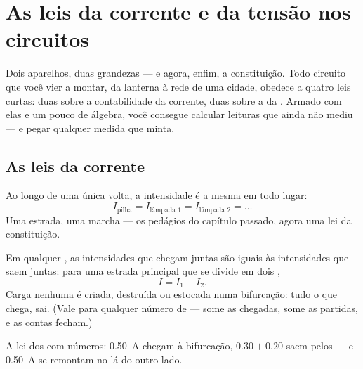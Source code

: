 \chapter{As leis da corrente e da tensão nos circuitos}\label{ch:g8:circuit-laws}

Dois aparelhos, duas grandezas --- e agora, enfim, a constituição.
Todo circuito que você vier a montar, da lanterna à rede de uma
cidade, obedece a quatro leis curtas: duas sobre a contabilidade da
corrente, duas sobre a da . Armado com elas e um pouco de
álgebra, você consegue calcular leituras que ainda não mediu --- e
pegar qualquer medida que minta.

\section{As leis da corrente}

\begin{proposition}\label{prop:g8:circuit-laws:seriesI}
Ao longo de uma única volta, a intensidade é a mesma em todo lugar:
\[
I_{\text{pilha}} = I_{\text{lâmpada 1}} = I_{\text{lâmpada 2}} =
\dots
\]
Uma estrada, uma marcha --- os pedágios do capítulo passado, agora
uma lei da constituição.
\end{proposition}

\begin{proposition}\label{prop:g8:circuit-laws:junction}
Em qualquer , as intensidades que chegam juntas são iguais às
intensidades que saem juntas: para uma estrada principal que se
divide em dois ,
\[
I = I_1 + I_2 .
\]
Carga nenhuma é criada, destruída ou estocada numa bifurcação: tudo o
que chega, sai. (Vale para qualquer número de  --- some as
chegadas, some as partidas, e as contas fecham.)
\end{proposition}

\begin{omfigure}

{\small A lei dos  com números: \qty{0.50}{A} chegam à
bifurcação, $0.30 + 0.20$ saem pelos  --- e \qty{0.50}{A} se
remontam no  lá do outro lado.}
\end{omfigure}

